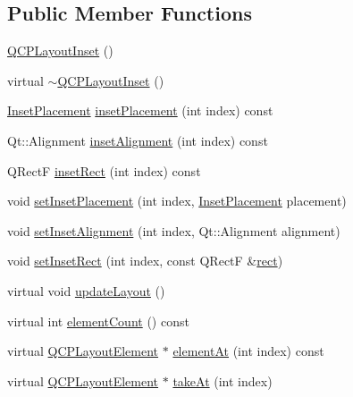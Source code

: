 \subsection*{Public Member Functions}
\begin{DoxyCompactItemize}
\item 
\hyperlink{class_q_c_p_layout_inset_a3ad984f3221735374cc5dee14356a7dd}{Q\+C\+P\+Layout\+Inset} ()
\item 
virtual \hyperlink{class_q_c_p_layout_inset_a7d0e5647b2e92df92abab532441db112}{$\sim$\+Q\+C\+P\+Layout\+Inset} ()
\item 
\hyperlink{class_q_c_p_layout_inset_a8b9e17d9a2768293d2a7d72f5e298192}{Inset\+Placement} \hyperlink{class_q_c_p_layout_inset_a8472ff2508807513e4cb0ce0c1d652b3}{inset\+Placement} (int index) const 
\item 
Qt\+::\+Alignment \hyperlink{class_q_c_p_layout_inset_a78c0c494bb5728237cebb63ae8ef5c58}{inset\+Alignment} (int index) const 
\item 
Q\+Rect\+F \hyperlink{class_q_c_p_layout_inset_a5ec7037b3b8d20fbf9560e01779b1442}{inset\+Rect} (int index) const 
\item 
void \hyperlink{class_q_c_p_layout_inset_a63298830744d5d8c5345511c00fd2144}{set\+Inset\+Placement} (int index, \hyperlink{class_q_c_p_layout_inset_a8b9e17d9a2768293d2a7d72f5e298192}{Inset\+Placement} placement)
\item 
void \hyperlink{class_q_c_p_layout_inset_a62882a4f9ad58bb0f53da12fde022abe}{set\+Inset\+Alignment} (int index, Qt\+::\+Alignment alignment)
\item 
void \hyperlink{class_q_c_p_layout_inset_aa487c8378a6f9533567a2e6430099dc3}{set\+Inset\+Rect} (int index, const Q\+Rect\+F \&\hyperlink{class_q_c_p_layout_element_affdfea003469aac3d0fac5f4e06171bc}{rect})
\item 
virtual void \hyperlink{class_q_c_p_layout_inset_a7b33fdd51b18e6db7cea9bfb2d263b4a}{update\+Layout} ()
\item 
virtual int \hyperlink{class_q_c_p_layout_inset_a2087b97b9266fd9e0f571a8d3cf709f9}{element\+Count} () const 
\item 
virtual \hyperlink{class_q_c_p_layout_element}{Q\+C\+P\+Layout\+Element} $\ast$ \hyperlink{class_q_c_p_layout_inset_ab096d07b08f9b5455647f3ba7ff60e27}{element\+At} (int index) const 
\item 
virtual \hyperlink{class_q_c_p_layout_element}{Q\+C\+P\+Layout\+Element} $\ast$ \hyperlink{class_q_c_p_layout_inset_ad6756a3b507e20496aaf7f5ca16c47d1}{take\+At} (int index)

\end{DoxyCompactItemize}
